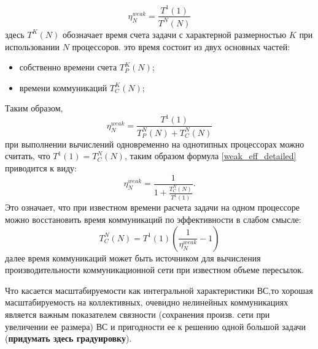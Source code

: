 \documentclass{book}
\begin{document}
	\begin{equation}
	\label{weak_eff}
	\eta^{weak}_N = \frac{T^1(1)}{T^N(N)}
	\end{equation}
	здесь $T^K(N)$ обозначает время счета задачи с характерной размерностью $K$ при использовании $N$ процессоров.
	это время состоит из двух основных частей:
	\begin{itemize}
		\item собственно времени счета $T^K_{P}(N)$;
		\item времени коммуникаций $T^K_C(N)$;
	\end{itemize}
	Таким образом,
	\begin{equation}
	\label{weak_eff_detailed}
	\eta^{weak}_N = \frac{T^1(1)}{T^N_{P}(N)+T^N_C(N)}
	\end{equation}
	при выполнении вычислений одновременно на однотипных процессорах
	можно считать, что $T^1(1) = T^N_C(N)$, таким образом формула
	\ref{weak_eff_detailed} приводится к виду:
	\begin{equation}
	\label{weak_eff_detailed-time}
	\eta^{weak}_N = \frac{1}{1+ \frac{T^N_{C}(N)}{T^1(1)}}.
	\end{equation}
	Это означает, что при известном времени расчета задачи на одном процессоре можно восстановить время коммуникаций по эффективности в слабом смысле:
	\begin{equation}
	\label{comm_time_from_efficiency}
	T^N_{C}(N) = T^1(1) \left(\frac{1}{\eta^{weak}_N} - 1\right)
	\end{equation}
	далее время коммуникаций может быть источником для вычисления производительности коммуникационной сети при известном объеме пересылок.
	
	Что касается масштабируемости как интегральной характеристики ВС,то хорошая масштабируемость на коллективных, очевидно нелинейных коммуникациях является важным показателем связности (сохранения произв. сети при увеличении ее размера) ВС и пригодности ее к решению одной большой задачи (\textbf{придумать здесь градуировку}).
	
	
\end{document}

